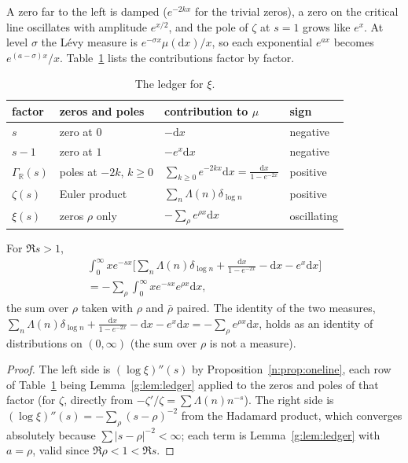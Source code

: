 A zero far to the left is damped ($e^{-2kx}$ for the trivial zeros), a zero on the critical line oscillates with amplitude $e^{x/2}$, and the pole of $\zeta$ at $s=1$ grows like $e^x$. At level $\sigma$ the L\'evy measure is $e^{-\sigma x}\mu(\mathrm dx)/x$, so each exponential $e^{ax}$ becomes $e^{(a-\sigma)x}/x$. Table~\ref{g:tab:ledger} lists the contributions factor by factor.

\begin{table}[t]
\centering
\small
\begin{tabular}{llll}
\toprule
factor & zeros and poles & contribution to $\mu$ & sign\\
\midrule
$s$ & zero at $0$ & $-\mathrm dx$ & negative\\
$s-1$ & zero at $1$ & $-e^x\mathrm dx$ & negative\\
$\Gamma_{\mathbb R}(s)$ & poles at $-2k$, $k\ge0$ & $\sum_{k\ge0}e^{-2kx}\mathrm dx=\frac{\mathrm dx}{1-e^{-2x}}$ & positive\\
$\zeta(s)$ & Euler product & $\sum_n\Lambda(n)\delta_{\log n}$ & positive\\
\midrule
$\xi(s)$ & zeros $\rho$ only & $-\sum_\rho e^{\rho x}\mathrm dx$ & oscillating\\
\bottomrule
\end{tabular}
\caption{The ledger for $\xi$.}\label{g:tab:ledger}
\end{table}

\begin{proposition}\label{g:prop:ledger}
For $\Re s>1$,
\begin{multline}\label{g:eq:ledger}
\int_0^\infty xe^{-sx}\Big[\sum_n\Lambda(n)\delta_{\log n}+\frac{\mathrm dx}{1-e^{-2x}}-\mathrm dx-e^x\mathrm dx\Big]\\
=-\sum_\rho\int_0^\infty xe^{-sx}e^{\rho x}\mathrm dx,
\end{multline}
the sum over $\rho$ taken with $\rho$ and $\bar\rho$ paired. The identity of the two measures, $\sum_n\Lambda(n)\delta_{\log n}+\frac{\mathrm dx}{1-e^{-2x}}-\mathrm dx-e^x\mathrm dx=-\sum_\rho e^{\rho x}\mathrm dx$, holds as an identity of distributions on $(0,\infty)$ (the sum over $\rho$ is not a measure).
\end{proposition}

\begin{proof}
The left side is $(\log\xi)''(s)$ by Proposition~\ref{n:prop:oneline}, each row of Table~\ref{g:tab:ledger} being Lemma~\ref{g:lem:ledger} applied to the zeros and poles of that factor (for $\zeta$, directly from $-\zeta'/\zeta=\sum\Lambda(n)n^{-s}$). The right side is $(\log\xi)''(s)=-\sum_\rho(s-\rho)^{-2}$ from the Hadamard product, which converges absolutely because $\sum|s-\rho|^{-2}<\infty$; each term is Lemma~\ref{g:lem:ledger} with $a=\rho$, valid since $\Re\rho<1<\Re s$.
\end{proof}

